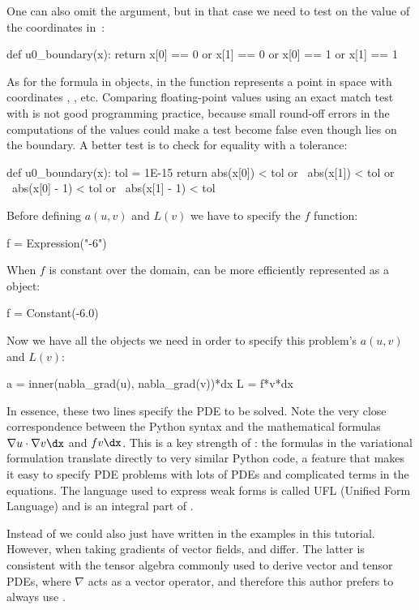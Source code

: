 One can also omit the  argument, but in that case we
need to test on the value of the coordinates in~:
\begin{python}
def u0_boundary(x):
    return x[0] == 0 or x[1] == 0 or x[0] == 1 or x[1] == 1
\end{python}
As for the formula in  objects,  in the
 function represents a point in space with coordinates
, , etc. Comparing floating-point values using an
exact match test with \emp{==} is not good programming practice, because
small round-off errors in the computations of the  values could
make a test  become false even though  lies on
the boundary.  A better test is to check for equality with a tolerance:
\begin{python}
def u0_boundary(x):
    tol = 1E-15
    return abs(x[0]) < tol or \
           abs(x[1]) < tol or \
           abs(x[0] - 1) < tol or \
           abs(x[1] - 1) < tol
\end{python}

Before defining $a(u,v)$ and $L(v)$ we have to specify the $f$ function:
\begin{python}
f = Expression("-6")
\end{python}
When $f$ is constant over the domain,  can be more efficiently
represented as a  object:
\begin{python}
f = Constant(-6.0)
\end{python}
Now we have all the objects we need in order to specify this problem's
$a(u,v)$ and $L(v)$:
\begin{python}
a = inner(nabla_grad(u), nabla_grad(v))*dx
L = f*v*dx
\end{python}
In essence, these two lines specify the PDE to be solved.  Note the
very close correspondence between the Python syntax and the mathematical
formulas $\nabla u\cdot\nabla v\dx$ and $fv\dx$.  This is a key strength
of \fenics: the formulas in the variational formulation translate directly
to very similar Python code, a feature that makes it easy to specify
PDE problems with lots of PDEs and complicated terms in the equations.
The language used to express weak forms is called UFL (Unified Form
Language) and is an integral part of \fenics.

Instead of \emp{nabla\_grad} we could also just have written
 in the examples in this tutorial. However, when taking
gradients of vector fields, \emp{grad} and 
differ. The latter is consistent with the tensor algebra commonly
used to derive vector and tensor PDEs, where $\nabla$ acts as a
vector operator, and therefore this author prefers to always use
\emp{nabla\_grad}.


